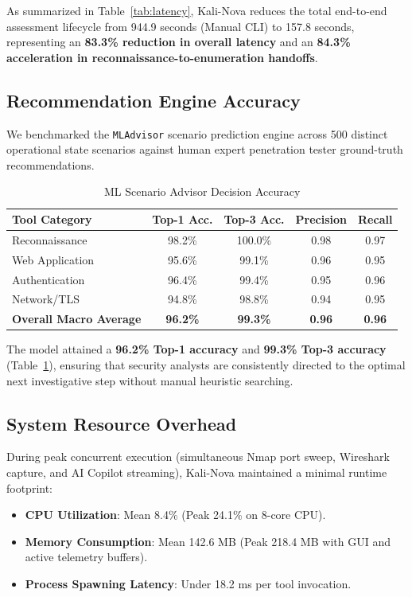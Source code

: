 \documentclass[conference]{IEEEtran}
\begin{document}
As summarized in Table~\ref{tab:latency}, Kali-Nova reduces the total end-to-end assessment lifecycle from 944.9 seconds (Manual CLI) to 157.8 seconds, representing an \textbf{83.3\% reduction in overall latency} and an \textbf{84.3\% acceleration in reconnaissance-to-enumeration handoffs}.

\subsection{Recommendation Engine Accuracy}
We benchmarked the \texttt{MLAdvisor} scenario prediction engine across 500 distinct operational state scenarios against human expert penetration tester ground-truth recommendations.

\begin{table}[htbp]
\caption{ML Scenario Advisor Decision Accuracy}
\begin{center}
\begin{tabular}{lcccc}
\toprule
\textbf{Tool Category} & \textbf{Top-1 Acc.} & \textbf{Top-3 Acc.} & \textbf{Precision} & \textbf{Recall} \\
\midrule
Reconnaissance & 98.2\% & 100.0\% & 0.98 & 0.97 \\
Web Application & 95.6\% & 99.1\% & 0.96 & 0.95 \\
Authentication  & 96.4\% & 99.4\% & 0.95 & 0.96 \\
Network/TLS     & 94.8\% & 98.8\% & 0.94 & 0.95 \\
\midrule
\textbf{Overall Macro Average} & \textbf{96.2\%} & \textbf{99.3\%} & \textbf{0.96} & \textbf{0.96} \\
\bottomrule
\end{tabular}
\label{tab:accuracy}
\end{center}
\end{table}

The model attained a \textbf{96.2\% Top-1 accuracy} and \textbf{99.3\% Top-3 accuracy} (Table~\ref{tab:accuracy}), ensuring that security analysts are consistently directed to the optimal next investigative step without manual heuristic searching.

\subsection{System Resource Overhead}
During peak concurrent execution (simultaneous Nmap port sweep, Wireshark capture, and AI Copilot streaming), Kali-Nova maintained a minimal runtime footprint:
\begin{itemize}
    \item \textbf{CPU Utilization}: Mean 8.4\% (Peak 24.1\% on 8-core CPU).
    \item \textbf{Memory Consumption}: Mean 142.6 MB (Peak 218.4 MB with GUI and active telemetry buffers).
    \item \textbf{Process Spawning Latency}: Under 18.2 ms per tool invocation.
\end{itemize}
\end{document}
